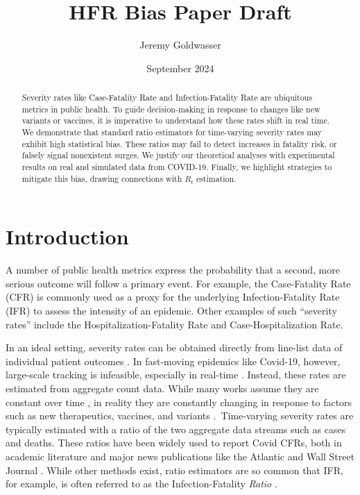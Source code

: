 \documentclass{article}
\title{HFR Bias Paper Draft}
\author{Jeremy Goldwasser}
\date{September 2024}
\begin{document}
\maketitle
\begin{abstract}
    Severity rates like Case-Fatality Rate and Infection-Fatality Rate are ubiquitous metrics in public health. To guide decision-making in response to changes like new variants or vaccines, it is imperative to understand how these rates shift in real time. We demonstrate that standard ratio estimators for time-varying severity rates may exhibit high statistical bias. These ratios may fail to detect increases in fatality risk, or falsely signal nonexistent surges. We justify our theoretical analyses with experimental results on real and simulated data from COVID-19. Finally, we highlight strategies to mitigate this bias, drawing connections with $R_t$ estimation.
\end{abstract}
\section{Introduction}

A number of public health metrics express the probability that a second, more serious outcome will follow a primary event. For example, the Case-Fatality Rate (CFR) is commonly used as a proxy for the underlying Infection-Fatality Rate (IFR) to assess the intensity of an epidemic. Other examples of such “severity rates” include the Hospitalization-Fatality Rate and Case-Hospitalization Rate. 

In an ideal setting, severity rates can be obtained directly from line-list data of individual patient outcomes \cite{HFR_line_list1,HFR_linelist2,HFR_linelist3,cfr_line_list}. In fast-moving epidemics like Covid-19, however, large-scale tracking is infeasible, especially in real-time \cite{UKpaper}. Instead, these rates are estimated from aggregate count data. While many works assume they are constant over time \cite{reich2012estimating,ghani,jewell2007nonparametric,lancet_controversial}, in reality they are constantly changing in response to factors such as new therapeutics, vaccines, and variants \cite{nyt}. Time-varying severity rates are typically estimated with a ratio of the two aggregate data streams such as cases and deaths. These ratios have been widely used to report Covid CFRs, both in academic literature \cite{germany,horita2022global,timevar_ifr,yuan2020monitoring,LIU2023100350} and major news publications like the Atlantic \cite{atlantic} and Wall Street Journal \cite{wsj}. While other methods exist, ratio estimators are so common that IFR, for example, is often referred to as the Infection-Fatality \textit{Ratio} \cite{timevar_ifr, lancet_ifr}.
\end{document}
